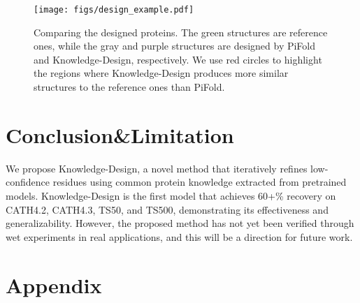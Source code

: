 \documentclass{article}
\begin{document}
\vspace{-3mm}
\begin{figure}[h]
   \centering
   \texttt{[image: figs/design\_example.pdf]}
   \vspace{-3mm}
   \caption{Comparing the designed proteins. The green structures are reference ones, while the gray and purple structures are designed by PiFold and Knowledge-Design, respectively. We use red circles to highlight the regions where Knowledge-Design produces more similar structures to the reference ones than PiFold.}
   \label{fig:design_example}
   \vspace{-3mm}
\end{figure}

\vspace{-3mm}
\section{Conclusion\&Limitation} 
\vspace{-3mm}
We propose Knowledge-Design, a novel method that iteratively refines low-confidence residues using common protein knowledge extracted from pretrained models. Knowledge-Design is the first model that achieves 60+\% recovery on CATH4.2, CATH4.3, TS50, and TS500, demonstrating its effectiveness and generalizability. However, the proposed method has not yet been verified through wet experiments in real applications, and this will be a direction for future work.
 



 




\clearpage
\appendix
\section{Appendix}
\end{document}
